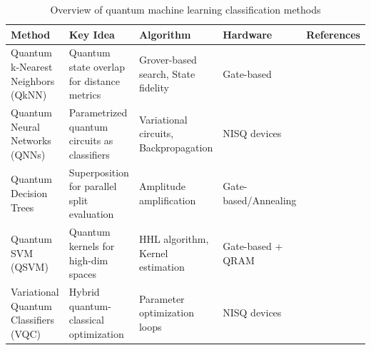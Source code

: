 \documentclass{article}
\begin{document}
\begin{table}[ht]
  \centering
  \scriptsize  %
  \caption{Overview of quantum machine learning classification methods}
  \label{tab:qml_methods}
  \begin{tabular}{@{}>{\RaggedRight}p{2.5cm}>{\RaggedRight}p{3cm}>{\RaggedRight}p{3cm}>{\RaggedRight}p{2cm}>{\RaggedRight}p{2cm}@{}}
  \toprule
  \textbf{Method} & \textbf{Key Idea} & \textbf{Algorithm} & \textbf{Hardware} & \textbf{References}\\
  \midrule
  Quantum k-Nearest Neighbors (QkNN) & 
  Quantum state overlap for distance metrics & 
  Grover-based search, State fidelity & 
  Gate-based & \\ 
  \addlinespace
  
  Quantum Neural Networks (QNNs) & 
  Parametrized quantum circuits as classifiers & 
  Variational circuits, Backpropagation & 
  NISQ devices & \\ 
  \addlinespace
  
  Quantum Decision Trees & 
  Superposition for parallel split evaluation & 
  Amplitude amplification & 
  Gate-based/Annealing &
  \\ 
  \addlinespace
  
  Quantum SVM (QSVM) & 
  Quantum kernels for high-dim spaces & 
  HHL algorithm, Kernel estimation & 
  Gate-based + QRAM & 
  \\ 
  \addlinespace
  
  Variational Quantum Classifiers (VQC) & 
  Hybrid quantum-classical optimization & 
  Parameter optimization loops & 
  NISQ devices &
  \\ 
  \bottomrule
  \end{tabular}
  \end{table}
\end{document}
